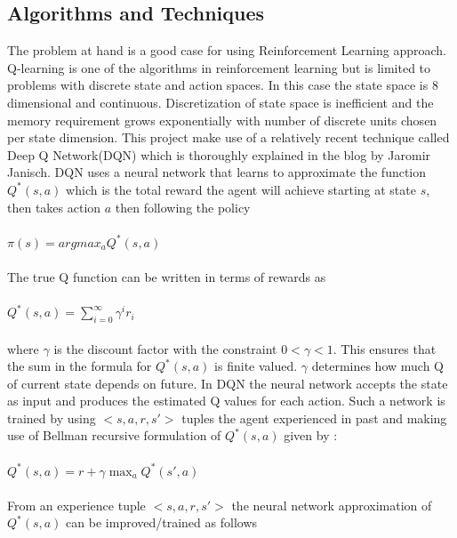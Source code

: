 \documentclass{svproc}
\begin{document}
\subsection*{Algorithms and Techniques}
The problem at hand is a good case for using Reinforcement Learning approach. Q-learning is one of the algorithms in reinforcement learning but is limited to problems with discrete state and action spaces. In this case the state space is 8 dimensional and continuous. Discretization of state space is inefficient and the memory requirement grows exponentially with number of discrete units chosen per state dimension. This project make use of a relatively recent technique called Deep Q Network(DQN)\cite{DQN} which is thoroughly explained in the blog by Jaromir Janisch\cite{Jaromir}. DQN uses a neural network that learns to approximate the function 
$Q^*(s, a)$ which is the total reward the agent will achieve starting at state $s$, then takes action $a$ then following the policy\\\\$\pi(s) = argmax_a Q^*(s, a)$\\\\
The true Q function can be written in terms of rewards as\\\\$Q^*(s, a) = \sum_{i=0}^{\infty} \gamma^i r_i$\\\\ where $\gamma$ is the discount factor with the constraint $0 < \gamma < 1$. This ensures that the sum in the formula for $Q^*(s, a)$ is finite valued. $\gamma$ determines how much Q of current state depends on future. In DQN the neural network accepts the state as input and produces the estimated Q values for each action. Such a network is trained by using $<s, a, r, s'>$ tuples the agent experienced in past and making use of Bellman recursive formulation of $Q^*(s, a)$ given by :\\\\
$Q^*(s, a) = r + \gamma \max_a Q^*(s', a)$\\\\
From an experience tuple $<s, a, r, s'>$ the neural network approximation of $Q^*(s,a)$ can be improved/trained as follows
\vspace{-0.09cm}
\end{document}
